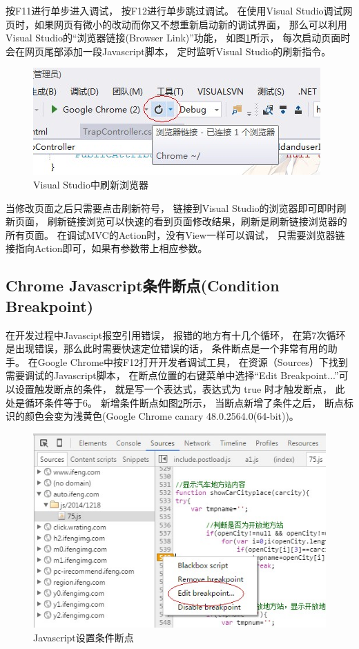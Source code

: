 \documentclass{book}
\begin{document}
按F11进行单步进入调试，
按F12进行单步跳过调试。
在使用Visual Studio调试网页时，如果网页有微小的改动而你又不想重新启动新的调试界面，
那么可以利用Visual Studio的“浏览器链接(Browser Link)”功能，
如图\ref{fig:VisualStudioBrowserLink}所示，
每次启动页面时会在网页尾部添加一段Javascript脚本，
定时监听Visual Studio的刷新指令。

\begin{figure}[htbp]
	\centering
	\includegraphics[scale=0.8]{VisualStudioBrowserLink.jpg}
	\caption{Visual Studio中刷新浏览器}
	\label{fig:VisualStudioBrowserLink}
\end{figure}

当修改页面之后只需要点击刷新符号，
链接到Visual Studio的浏览器即可即时刷新页面，
刷新链接浏览可以快速的看到页面修改结果，刷新是刷新链接浏览器的所有页面。
在调试MVC的Action时，没有View一样可以调试，
只需要浏览器链接指向Action即可，如果有参数带上相应参数。


\subsection{Chrome Javascript条件断点(Condition Breakpoint)}

在开发过程中Javascipt报空引用错误，
报错的地方有十几个循环，
在第7次循环是出现错误，那么此时需要快速定位错误的话，
条件断点是一个非常有用的助手。
在Google Chrome中按F12打开开发者调试工具，
在资源（Sources）下找到需要调试的Javascript脚本，
在断点位置的右键菜单中选择“Edit Breakpoint...”可以设置触发断点的条件，
就是写一个表达式，表达式为 true 时才触发断点，
此处是循环条件等于6。
新增条件断点如图\ref{fig:ConditionBreakpoints}所示，
当断点新增了条件之后，
断点标识的颜色会变为浅黄色(Google Chrome canary 48.0.2564.0(64-bit))。

\begin{figure}[htbp]
	\centering
	\includegraphics[scale=0.8]{ConditionBreakpoints.jpg}
	\caption{Javascript设置条件断点}
	\label{fig:ConditionBreakpoints}
\end{figure}
\end{document}
